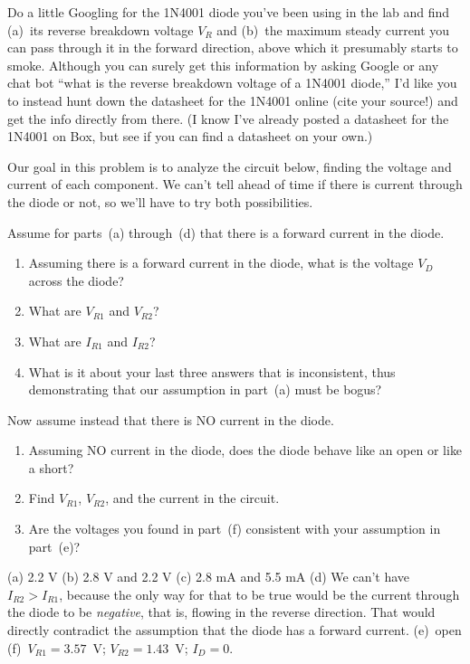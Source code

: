 \begin{Exercise}
Do a little Googling for the 1N4001 diode you've been using in the lab and find (a)~its reverse breakdown voltage $V_R$ and (b)~the maximum steady current you can pass through it in the forward direction, above which it presumably starts to smoke.  Although you can surely get this information by asking Google or any chat bot ``what is the reverse breakdown voltage of a 1N4001 diode,'' I'd like you to instead hunt down the datasheet for the 1N4001 online (cite your source!) and get the info directly from there.   (I know I've already posted a datasheet for the 1N4001 on Box, but see if you can find a datasheet on your own.)
\end{Exercise}


\begin{Exercise}
\label{prob_first_diode_resistor_with_steps}
Our goal in this problem is to analyze the circuit below, finding the voltage and current of each component.  We can't tell ahead of time if there is current through the diode or not, so we'll have to try both possibilities.  

 {
Assume for parts~(a) through~(d) that there is a forward current in the diode.  
\begin{enumerate}[label=(\alph*),nosep]
\item Assuming there is a forward current in the diode, what is the voltage $V_D$ across the diode?  
\item What are $V_{R1}$ and $V_{R2}$?  
\item What are $I_{R1}$ and $I_{R2}$?
\item What is it about your last three answers that is inconsistent, thus demonstrating that our assumption in part~(a) must be bogus?  
\end{enumerate}
}

Now assume instead that there is NO current in the diode.  
\begin{enumerate}[label=(\alph*),nosep,start=5]
\item Assuming NO current in the diode, does the diode behave like an open or like a short?  
\item Find $V_{R1}$, $V_{R2}$, and the current in the circuit.  
\item Are the voltages you found in part~(f) consistent with your assumption in part~(e)?
\end{enumerate}
\end{Exercise}
\begin{Answer}
(a) 2.2 V (b) 2.8 V and 2.2 V (c) 2.8 mA and 5.5 mA (d) We can't have $I_{R2}>I_{R1}$, because the only way for that to be true would be the current through the diode to be \textit{negative}, that is, flowing in the reverse direction. That would directly contradict the assumption that the diode has a forward current. (e)~open (f)~$V_{R1}=3.57$~V; $V_{R2}=1.43$~V; $I_D=0.$
\end{Answer}


